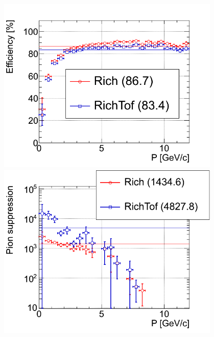 
\begin{figure}[H]
\begin{minipage}[t]{0.495\textwidth}
\includegraphics[width=0.95\textwidth]{pictures/RICHeff1.png}
\end{minipage}
\begin{minipage}[t]{0.495\textwidth}
\includegraphics[width=0.95\textwidth]{pictures/RICHeff2.png}
\end{minipage}
\begin{minipage}[t]{0.495\textwidth}

\end{minipage}
\end{figure}
